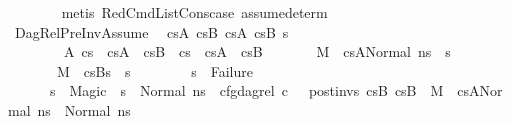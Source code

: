 \begin{isabellebody}
\ \ \ \ \ \ \isamarkupfalse%
\ {\isacharparenleft}{\kern0pt}metis\ RedCmdListCons{\isacharunderscore}{\kern0pt}case\ assume{\isacharunderscore}{\kern0pt}determ{\isacharparenright}{\kern0pt}\isanewline
\ \ \ \ \isamarkupfalse%
\ DagRel{\isacharunderscore}{\kern0pt}PreInv{\isacharunderscore}{\kern0pt}Assume\ \isamarkupfalse%
\ cs{}A\ cs{}B\ cs{}A\ cs{}B\ s{\isacharprime}{\kern0pt}{\isacharprime}{\kern0pt}\ \isanewline
\ \ \ \ \ \ \ \ A{\isacharcolon}{\kern0pt}\ {\isachardoublequoteopen}cs{}\ {\isacharequal}{\kern0pt}\ cs{}A\ {\isacharat}{\kern0pt}\ cs{}B{\isachardoublequoteclose}\ \ {\isachardoublequoteopen}cs{}\ {\isacharequal}{\kern0pt}\ cs{}A\ {\isacharat}{\kern0pt}\ cs{}B{\isachardoublequoteclose}\isanewline
\ \ \ \ \ \ \ {\isachardoublequoteopen}{\isacharparenleft}{\kern0pt}M{\isacharcomma}{\kern0pt}{\isasymLambda}{\isacharcomma}{\kern0pt}{\isasymGamma}{\isacharcomma}{\kern0pt}{\isasymOmega}\ {\isasymturnstile}\ {\isasymlangle}cs{}A{\isacharcomma}{\kern0pt}Normal\ ns{}{\isasymrangle}\ {\isacharbrackleft}{\kern0pt}{\isasymrightarrow}{\isacharbrackright}{\kern0pt}\ s{\isacharprime}{\kern0pt}{\isacharprime}{\kern0pt}{\isacharparenright}{\kern0pt}{\isachardoublequoteclose}\ \isanewline
\ \ \ \ \ \ \ {\isachardoublequoteopen}{\isacharparenleft}{\kern0pt}M{\isacharcomma}{\kern0pt}{\isasymLambda}{\isacharcomma}{\kern0pt}{\isasymGamma}{\isacharcomma}{\kern0pt}{\isasymOmega}\ {\isasymturnstile}\ {\isasymlangle}cs{}B{\isacharcomma}{\kern0pt}s{\isacharprime}{\kern0pt}{\isacharprime}{\kern0pt}{\isasymrangle}\ {\isacharbrackleft}{\kern0pt}{\isasymrightarrow}{\isacharbrackright}{\kern0pt}\ s{\isacharprime}{\kern0pt}{\isacharparenright}{\kern0pt}{\isachardoublequoteclose}\ \isanewline
\ \ \ \ \ \ \ {\isachardoublequoteopen}s{\isacharprime}{\kern0pt}{\isacharprime}{\kern0pt}\ {\isasymnoteq}\ Failure{\isachardoublequoteclose}\ \isanewline
\ \ \ \ \ \ {\isachardoublequoteopen}{\isacharparenleft}{\kern0pt}s{\isacharprime}{\kern0pt}{\isacharprime}{\kern0pt}\ {\isasymnoteq}\ Magic\ {\isasymlongrightarrow}\ s{\isacharprime}{\kern0pt}{\isacharprime}{\kern0pt}\ {\isacharequal}{\kern0pt}\ Normal\ ns{}\ {\isasymand}\ cfg{\isacharunderscore}{\kern0pt}dag{\isacharunderscore}{\kern0pt}rel\ c\ {\isacharbrackleft}{\kern0pt}{\isacharbrackright}{\kern0pt}\ {\isacharbrackleft}{\kern0pt}{\isacharbrackright}{\kern0pt}\ post{\isacharunderscore}{\kern0pt}invs\ cs{}B\ cs{}B\ {\isasymand}\ M{\isacharcomma}{\kern0pt}{\isasymLambda}{\isacharcomma}{\kern0pt}{\isasymGamma}{\isacharcomma}{\kern0pt}{\isasymOmega}\ {\isasymturnstile}\ {\isasymlangle}cs{}A{\isacharcomma}{\kern0pt}Normal\ ns{}{\isasymrangle}\ {\isacharbrackleft}{\kern0pt}{\isasymrightarrow}{\isacharbrackright}{\kern0pt}\ Normal\ ns{}{\isacharparenright}{\kern0pt}{\isachardoublequoteclose}\isanewline

\end{isabellebody}
